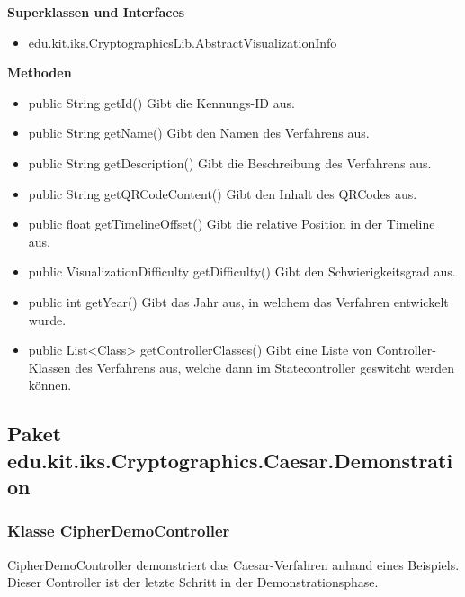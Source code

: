 \documentclass{article}
\begin{document}
      \textbf{Superklassen und Interfaces}
      \begin{itemize}
        \item edu.kit.iks.CryptographicsLib.AbstractVisualizationInfo
      \end{itemize}
      
      \textbf{Methoden}
      \begin{itemize}
        \item public String getId() \newline
        Gibt die Kennungs-ID aus.
        \item public String getName() \newline
        Gibt den Namen des Verfahrens aus.
        \item public String getDescription() \newline
        Gibt die Beschreibung des Verfahrens aus.
        \item public String getQRCodeContent() \newline
        Gibt den Inhalt des QRCodes aus.
        \item public float getTimelineOffset() \newline
        Gibt die relative Position in der Timeline aus.
        \item public VisualizationDifficulty getDifficulty() \newline
        Gibt den Schwierigkeitsgrad aus.
        \item public int getYear() \newline
        Gibt das Jahr aus, in welchem das Verfahren entwickelt wurde.
        \item public List<Class> getControllerClasses() \newline
        Gibt eine Liste von Controller-Klassen des Verfahrens aus, welche dann im Statecontroller geswitcht werden können.
      \end{itemize}

  \subsection{Paket edu.kit.iks.Cryptographics.Caesar.Demonstration}


\subsubsection{Klasse CipherDemoController}
      CipherDemoController demonstriert das Caesar-Verfahren anhand eines Beispiels. Dieser Controller ist der letzte Schritt in der Demonstrationsphase.
\end{document}
